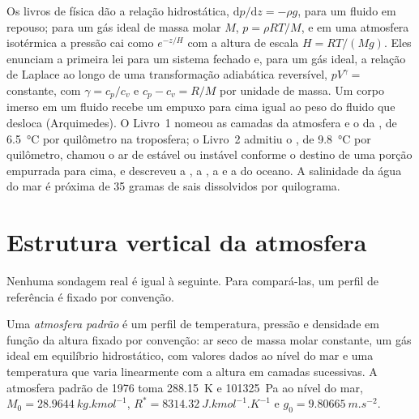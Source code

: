 \begin{recall}
Os livros de física dão a relação hidrostática, $\mathrm dp/\mathrm dz =
-\rho g$, para um fluido em repouso; para um gás ideal de massa molar $M$, $p = \rho R
T/M$, e em uma atmosfera isotérmica a pressão cai como $e^{-z/H}$ com a altura de escala
$H = RT/(Mg)$. Eles enunciam a primeira lei para um sistema fechado e, para um gás ideal, a
relação de Laplace ao longo de uma transformação adiabática reversível, $pV^{\gamma} = $
constante, com $\gamma = c_p/c_v$ e $c_p - c_v
= R/M$ por unidade de massa. Um corpo imerso em um fluido recebe um empuxo para cima igual
ao peso do fluido que desloca (Arquimedes). O Livro~1 nomeou as camadas da atmosfera e o
 da , de \qty{6.5}{\celsius} por quilômetro na troposfera; o
Livro~2 admitiu o , de \qty{9.8}{\celsius} por quilômetro, chamou o ar
de estável ou instável conforme o destino de uma porção empurrada para cima, e descreveu a
, a , a  e a  do oceano. A salinidade da água do
mar é próxima de 35 gramas de sais dissolvidos por quilograma.
\end{recall}

\section{Estrutura vertical da atmosfera}\label{sec:b1:fluid-envelopes-structure:atmosphere}

Nenhuma sondagem real é igual à seguinte. Para compará-las, um perfil de referência é fixado por
convenção.

\begin{definition}\label{def:b1:fluid-envelopes-structure:standard-atmosphere}
Uma \emph{atmosfera padrão} é um perfil de temperatura, pressão e
densidade em função da altura fixado por convenção: ar seco de massa molar constante, um gás
ideal em equilíbrio hidrostático, com valores dados ao nível do mar e uma temperatura que varia
linearmente com a altura em camadas sucessivas. A atmosfera padrão de 1976 toma
\qty{288.15}{K} e \qty{101325}{Pa} ao nível do mar, $M_0 = \qty{28.9644}{kg.kmol^{-1}}$,
$R^* = \qty{8314.32}{J.kmol^{-1}.K^{-1}}$ e $g_0 = \qty{9.80665}{m.s^{-2}}$.
\end{definition}


